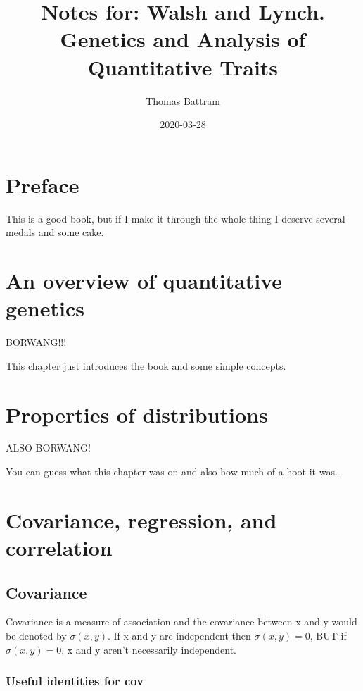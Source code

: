 \documentclass[
]{book}
\title{Notes for: Walsh and Lynch. Genetics and Analysis of Quantitative Traits}
\author{Thomas Battram}
\date{2020-03-28}
\begin{document}
\maketitle

{
\setcounter{tocdepth}{1}
\tableofcontents
}
\hypertarget{preface}{%
\chapter*{Preface}\label{preface}}

This is a good book, but if I make it through the whole thing I deserve several medals and some cake.

\hypertarget{an-overview-of-quantitative-genetics}{%
\chapter{An overview of quantitative genetics}\label{an-overview-of-quantitative-genetics}}

BORWANG!!!

This chapter just introduces the book and some simple concepts.

\hypertarget{properties-of-distributions}{%
\chapter{Properties of distributions}\label{properties-of-distributions}}

ALSO BORWANG!

You can guess what this chapter was on and also how much of a hoot it was\ldots{}

\hypertarget{covariance-regression-and-correlation}{%
\chapter{Covariance, regression, and correlation}\label{covariance-regression-and-correlation}}

\hypertarget{covariance}{%
\section{Covariance}\label{covariance}}

Covariance is a measure of association and the covariance between x and y would be denoted by \(\sigma(x, y)\). If x and y are independent then \(\sigma(x, y) = 0\), BUT if \(\sigma(x, y) = 0\), x and y aren't necessarily independent.

\hypertarget{useful-identities-for-cov}{%
\subsection{Useful identities for cov}\label{useful-identities-for-cov}}
\end{document}
